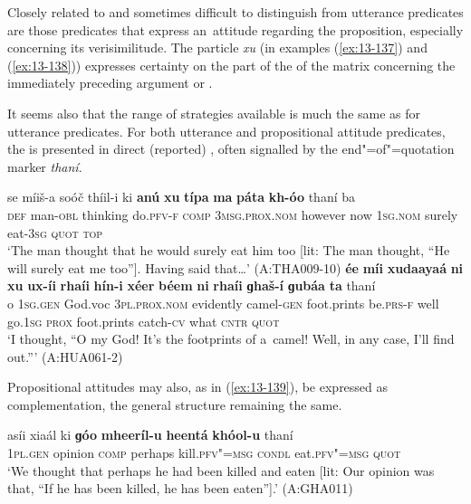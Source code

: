  Closely related to and sometimes difficult to distinguish from utterance predicates are those predicates that express an~attitude regarding the  proposition, especially concerning its verisimilitude. The particle \textit{xu} (in examples (\ref{ex:13-137}) and (\ref{ex:13-138})) expresses certainty on the part of the  of the matrix  concerning the immediately preceding argument or .


It seems also that the range of strategies available is much the same as for utterance predicates. For both utterance and propositional attitude predicates, the  is presented in direct (reported) , often signalled by the end"=of"=quotation marker \textit{thaní}. 

\ea
\label{ex:13-137}
\gll se míiš-a soóč thíil-i ki \textbf{anú} \textbf{xu} \textbf{típa} \textbf{ma} \textbf{páta} \textbf{kh-óo} thaní ba\\
\textsc{def } man-\textsc{obl} thinking do.\textsc{pfv-f} \textsc{comp} \textsc{3msg.prox.nom} however now \textsc{1sg.nom} surely eat-\textsc{3sg} \textsc{quot} \textsc{top}\\
\glt `The man thought that he would surely eat him too [lit: The man thought, ``He will surely eat me too'']. Having said that{\ldots}' (A:THA009-10)
\ex
\label{ex:13-138}
\gll \textbf{ée} \textbf{míi} \textbf{xudaayaá} \textbf{ni} \textbf{xu} \textbf{ux-íi} \textbf{rhaíi} \textbf{hín-i} \textbf{xéer} \textbf{béem} \textbf{ni} \textbf{rhaíi} \textbf{ɡhaš-í} \textbf{ɡubáa} \textbf{ta} thaní\\
o \textsc{1sg.gen} God.voc \textsc{3pl.prox.nom} evidently camel-\textsc{gen} foot.prints be.\textsc{prs-f} well go.\textsc{1sg} \textsc{prox} foot.prints catch-\textsc{cv} what \textsc{cntr} \textsc{quot}\\
\glt `I thought, ``O my God! It's the footprints of a~camel! Well, in any case, I'll find out.''' (A:HUA061-2) 
\z

Propositional attitudes may also, as in (\ref{ex:13-139}), be expressed as  complementation, the general structure remaining the same.

\begin{exe}
\ex
\label{ex:13-139}
\gll asíi xiaál ki \textbf{ɡóo} \textbf{mheeríl-u} \textbf{heentá} \textbf{ khóol-u} thaní \\
\textsc{1pl}.\textsc{gen}  opinion \textsc{comp} perhaps kill.\textsc{pfv"=msg}  \textsc{condl} eat.\textsc{pfv"=msg} \textsc{quot} \\
\glt `We thought that perhaps he had been killed and eaten [lit: Our opinion was that, ``If he has been killed, he has been eaten''].' (A:GHA011) 
\end{exe}

